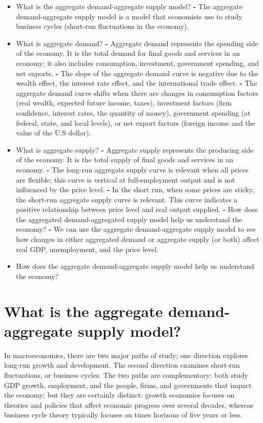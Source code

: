 \documentclass[11pt]{article} %
\begin{document}
\begin{tcolorbox}[width=\textwidth,colback={white},title={Big Questions},colbacktitle=yellow,coltitle=blue]
\begin{itemize}
\item What is the aggregate demand-aggregate supply model?
	\subitem \textbf{-} The aggregate demand-aggregate supply model is a model that economists use to study business cycles (short-run fluctuations in the economy).
\item What is aggregate demand?
	\subitem \textbf{-} Aggregate demand represents the spending side of the economy. It is the total demand for final goods and services in an economy; it also includes consumption, investment, government spending, and net exports.
	\subitem \textbf{-} The slope of the aggregate demand curve is negative due to the wealth effect, the interest rate effect, and the international trade effect.
	\subitem \textbf{-} The aggregate demand curve shifts when there are changes in consumption factors (real wealth, expected future income, taxes), investment factors (firm confidence, interest rates, the quantity of money), government spending (at federal, state, and local levels), or net export factors (foreign income and the value of the U.S dollar).
\item What is aggregate supply?
	\subitem \textbf{-} Aggregate supply represents the producing side of the economy. It is the total supply of final goods and services in an economy.
	\subitem \textbf{-} The long-run aggregate supply curve is relevant when all prices are flexible; this curve is vertical at full-employment output and is not influenced by the price level.
	\subitem \textbf{-} In the short run, when some prices are sticky, the short-run aggregate supply curve is relevant. This curve indicates a positive relationship between price level and real output supplied.
	\subitem \textbf{-} How does the aggregated demand-aggregated supply model help us understand the economy?
	\subitem \textbf{-} We can use the aggregate demand-aggregate supply model to see how changes in either aggregated demand or aggregate supply (or both) affect real GDP, unemployment, and the price level.
\item How does the aggregate demand-aggregate supply model help us understand the economy?
\end{itemize}
\end{tcolorbox}

\section*{\textbf{What is the aggregate demand-aggregate supply model?}}
In macroeconomics, there are two major paths of study; one direction explores long-run growth and development. The second direction examines short-run fluctuations, or business cycles. The two paths are complementary: both study GDP growth, employment, and the people, firms, and governments that impact the economy; but they are certainly distinct: growth economics focuses on theories and policies that affect economic progress over several decades, whereas business cycle theory typically focuses on times horizons of five years or less.
\end{document}

